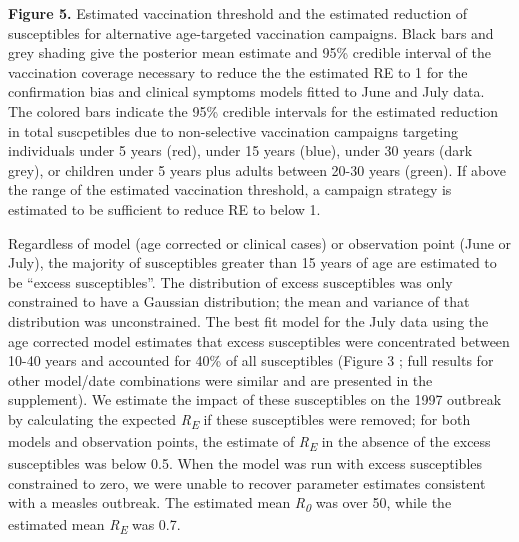 \textbf{Figure 5.} Estimated vaccination threshold and the estimated
reduction of susceptibles for alternative age-targeted vaccination
campaigns. Black bars and grey shading give the posterior mean estimate
and 95\% credible interval of the vaccination coverage necessary to
reduce the the estimated RE to 1 for the confirmation bias and clinical
symptoms models fitted to June and July data. The colored bars indicate
the 95\% credible intervals for the estimated reduction in total
suscpetibles due to non-selective vaccination campaigns targeting
individuals under 5 years (red), under 15 years (blue), under 30 years
(dark grey), or children under 5 years plus adults between 20-30 years
(green). If above the range of the estimated vaccination threshold, a
campaign strategy is estimated to be sufficient to reduce RE to below 1.

Regardless of model (age corrected or clinical cases) or observation
point (June or July), the majority of susceptibles greater than 15 years
of age are estimated to be ``excess susceptibles''. The distribution of
excess susceptibles was only constrained to have a Gaussian
distribution; the mean and variance of that distribution was
unconstrained. The best fit model for the July data using the age
corrected model estimates that excess susceptibles were concentrated
between 10-40 years and accounted for 40\% of all susceptibles (Figure 3
; full results for other model/date combinations were similar and are
presented in the supplement). We estimate the impact of these
susceptibles on the 1997 outbreak by calculating the expected
\emph{R\textsubscript{E}} if these susceptibles were removed; for both
models and observation points, the estimate of \emph{R\textsubscript{E}}
in the absence of the excess susceptibles was below 0.5. When the model
was run with excess susceptibles constrained to zero, we were unable to
recover parameter estimates consistent with a measles outbreak. The
estimated mean \emph{R\textsubscript{0}} was over 50, while the
estimated mean \emph{R\textsubscript{E}} was 0.7.